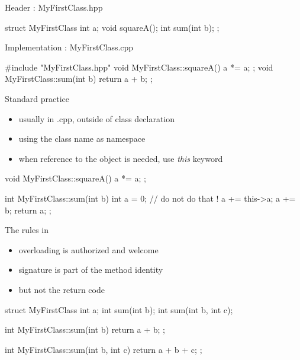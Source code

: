 \begin{frame}[fragile]
  \begin{block}{Header : MyFirstClass.hpp}
    \begin{cppcode*}{}
      struct MyFirstClass {
        int a;
        void squareA();
        int sum(int b);
      };
    \end{cppcode*}
  \end{block}
  \begin{block}{Implementation : MyFirstClass.cpp}
    \begin{cppcode*}{}
      #include "MyFirstClass.hpp"
      void MyFirstClass::squareA() {
        a *= a;
      };
      void MyFirstClass::sum(int b) {
        return a + b;
      };
    \end{cppcode*}
  \end{block}
\end{frame}

\begin{frame}[fragile]
  \begin{block}{Standard practice}
    \begin{itemize}
    \item usually in .cpp, outside of class declaration
    \item using the class name as namespace
    \item when reference to the object is needed, use {\it this} keyword
    \end{itemize}
  \end{block}
  \begin{cppcode}
    void MyFirstClass::squareA() {
      a *= a;
    };

    int MyFirstClass::sum(int b) {
      int a = 0; // do not do that !
      a += this->a;
      a += b;
      return a;
    };
  \end{cppcode}
\end{frame}

\begin{frame}[fragile]
  \begin{block}{The rules in \cpp}
    \begin{itemize}
    \item overloading is authorized and welcome
    \item signature is part of the method identity
    \item but not the return code
    \end{itemize}
  \end{block}
  \begin{cppcode}
    struct MyFirstClass {
      int a;
      int sum(int b);
      int sum(int b, int c);
    }

    int MyFirstClass::sum(int b) { return a + b; };

    int MyFirstClass::sum(int b, int c) {
      return a + b + c;
    };
  \end{cppcode}
\end{frame}

